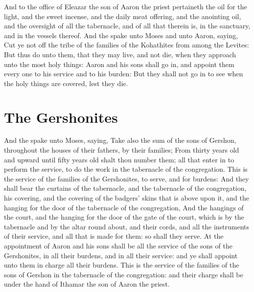 \begin{biblechapter}
\verse And to the office of Eleazar the son of Aaron the priest pertaineth the oil for the light, and the sweet incense, and the daily meat offering, and the anointing oil, and the oversight of all the tabernacle, and of all that therein is, in the sanctuary, and in the vessels thereof.
\verse And the \LORD spake unto Moses and unto Aaron, saying,
\verse Cut ye not off the tribe of the families of the Kohathites from among the Levites:
\verse But thus do unto them, that they may live, and not die, when they approach unto the most holy things: Aaron and his sons shall go in, and appoint them every one to his service and to his burden:
\verse But they shall not go in to see when the holy things are covered, lest they die.
\section*{The Gershonites}
\verse And the \LORD spake unto Moses, saying,
\verse Take also the sum of the sons of Gershon, throughout the houses of their fathers, by their families;
\verse From thirty years old and upward until fifty years old shalt thou number them; all that enter in to perform the service, to do the work in the tabernacle of the congregation.
\verse This is the service of the families of the Gershonites, to serve, and for burdens:
\verse And they shall bear the curtains of the tabernacle, and the tabernacle of the congregation, his covering, and the covering of the badgers' skins that is above upon it, and the hanging for the door of the tabernacle of the congregation,
\verse And the hangings of the court, and the hanging for the door of the gate of the court, which is by the tabernacle and by the altar round about, and their cords, and all the instruments of their service, and all that is made for them: so shall they serve.
\verse At the appointment of Aaron and his sons shall be all the service of the sons of the Gershonites, in all their burdens, and in all their service: and ye shall appoint unto them in charge all their burdens.
\verse This is the service of the families of the sons of Gershon in the tabernacle of the congregation: and their charge shall be under the hand of Ithamar the son of Aaron the priest.

\end{biblechapter}
